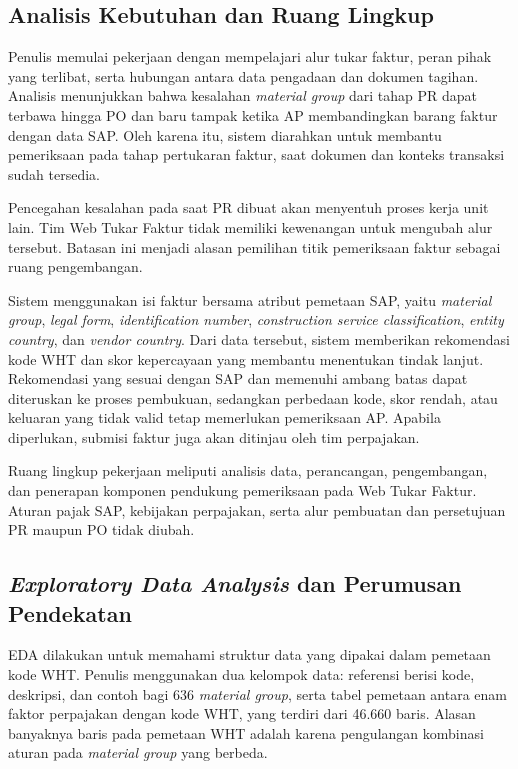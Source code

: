 \subsection{Analisis Kebutuhan dan Ruang Lingkup}
\label{subsec:analisis_kebutuhan_ruang_lingkup}

Penulis memulai pekerjaan dengan mempelajari alur tukar faktur, peran pihak yang terlibat, serta hubungan antara data pengadaan dan dokumen tagihan. Analisis menunjukkan bahwa kesalahan \textit{material group} dari tahap PR dapat terbawa hingga PO dan baru tampak ketika AP membandingkan barang faktur dengan data SAP. Oleh karena itu, sistem diarahkan untuk membantu pemeriksaan pada tahap pertukaran faktur, saat dokumen dan konteks transaksi sudah tersedia.

Pencegahan kesalahan pada saat PR dibuat akan menyentuh proses kerja unit lain. Tim Web Tukar Faktur tidak memiliki kewenangan untuk mengubah alur tersebut. Batasan ini menjadi alasan pemilihan titik pemeriksaan faktur sebagai ruang pengembangan.

Sistem menggunakan isi faktur bersama atribut pemetaan SAP, yaitu \textit{material group}, \textit{legal form}, \textit{identification number}, \textit{construction service classification}, \textit{entity country}, dan \textit{vendor country}. Dari data tersebut, sistem memberikan rekomendasi kode WHT dan skor kepercayaan yang membantu menentukan tindak lanjut. Rekomendasi yang sesuai dengan SAP dan memenuhi ambang batas dapat diteruskan ke proses pembukuan, sedangkan perbedaan kode, skor rendah, atau keluaran yang tidak valid tetap memerlukan pemeriksaan AP. Apabila diperlukan, submisi faktur juga akan ditinjau oleh tim perpajakan.

Ruang lingkup pekerjaan meliputi analisis data, perancangan, pengembangan, dan penerapan komponen pendukung pemeriksaan pada Web Tukar Faktur. Aturan pajak SAP, kebijakan perpajakan, serta alur pembuatan dan persetujuan PR maupun PO tidak diubah.

\subsection{\textit{Exploratory Data Analysis} dan Perumusan Pendekatan}
\label{subsec:eda_perumusan_pendekatan}

\label{abbr:EDA}EDA dilakukan untuk memahami struktur data yang dipakai dalam pemetaan kode WHT. Penulis menggunakan dua kelompok data: referensi berisi kode, deskripsi, dan contoh bagi 636 \textit{material group}, serta tabel pemetaan antara enam faktor perpajakan dengan kode WHT, yang terdiri dari 46.660 baris. Alasan banyaknya baris pada pemetaan WHT adalah karena pengulangan kombinasi aturan pada \textit{material group} yang berbeda.

